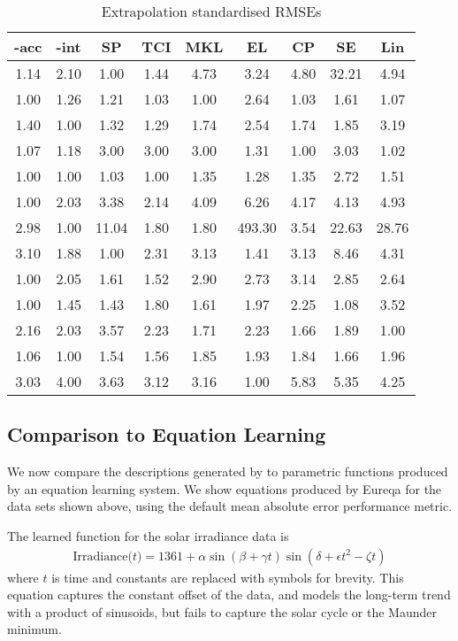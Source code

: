 \begin{table*}[ht]
\center
\begin{tabular}{|c|c|c|c|c|c|c|c|c|}
\hline
\procedurename{}-acc & \procedurename{}-int & SP & TCI & MKL & EL & CP & SE & Lin \\
\hline
1.14 & 2.10 & 1.00 & 1.44 & 4.73 & 3.24 & 4.80 & 32.21 & 4.94\\
1.00 & 1.26 & 1.21 & 1.03 & 1.00 & 2.64 & 1.03 & 1.61 & 1.07\\
1.40 & 1.00 & 1.32 & 1.29 & 1.74 & 2.54 & 1.74 & 1.85 & 3.19\\
1.07 & 1.18 & 3.00 & 3.00 & 3.00 & 1.31 & 1.00 & 3.03 & 1.02\\
1.00 & 1.00 & 1.03 & 1.00 & 1.35 & 1.28 & 1.35 & 2.72 & 1.51\\
1.00 & 2.03 & 3.38 & 2.14 & 4.09 & 6.26 & 4.17 & 4.13 & 4.93\\
2.98 & 1.00 & 11.04 & 1.80 & 1.80 & 493.30 & 3.54 & 22.63 & 28.76\\
3.10 & 1.88 & 1.00 & 2.31 & 3.13 & 1.41 & 3.13 & 8.46 & 4.31\\
1.00 & 2.05 & 1.61 & 1.52 & 2.90 & 2.73 & 3.14 & 2.85 & 2.64\\
1.00 & 1.45 & 1.43 & 1.80 & 1.61 & 1.97 & 2.25 & 1.08 & 3.52\\
2.16 & 2.03 & 3.57 & 2.23 & 1.71 & 2.23 & 1.66 & 1.89 & 1.00\\
1.06 & 1.00 & 1.54 & 1.56 & 1.85 & 1.93 & 1.84 & 1.66 & 1.96\\
3.03 & 4.00 & 3.63 & 3.12 & 3.16 & 1.00 & 5.83 & 5.35 & 4.25\\
\hline
\end{tabular}
\caption[Extrapolation error]{Extrapolation standardised RMSEs}
\label{table:extrap}
\end{table*}

\fi


\iffalse

\subsection{Comparison to Equation Learning}
\label{sec:eqn-learning-comp}

We now compare the descriptions generated by \procedurename{} to parametric functions produced by an equation learning system.
We show equations produced by Eureqa \citep{Eureqa} for the data sets shown above, using the default mean absolute error performance metric.

The learned function for the solar irradiance data is
\begin{align*}
\textrm{Irradiance($t$)} = 1361 + \alpha\sin(\beta + \gamma t)\sin(\delta + \epsilon t^2 - \zeta t)
\end{align*}
where $t$ is time and constants are replaced with symbols for brevity.
This equation captures the constant offset of the data, and models the long-term trend with a product of sinusoids, but fails to capture the solar cycle or the Maunder minimum.

